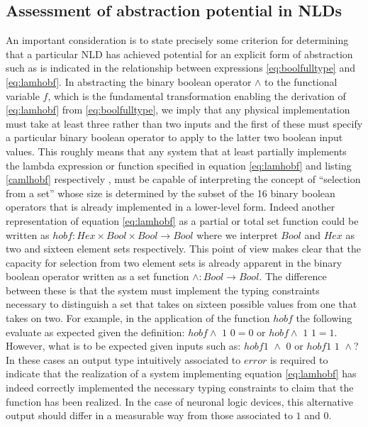 \subsection{Assessment of abstraction potential in NLDs}

An important consideration is to state precisely some criterion for
determining that a particular NLD has achieved potential for an explicit
form of abstraction such as is indicated in the relationship between
expressions \ref{eq:boolfulltype} and
\ref{eq:lamhobf}. In abstracting the binary boolean
operator $\wedge$ to the functional variable
$f$, which is the fundamental
transformation enabling the derivation of
\ref{eq:lamhobf} from
\ref{eq:boolfulltype}, we imply that any physical
implementation must take at least three rather than two inputs and the
first of these must specify a particular binary boolean operator to
apply to the latter two boolean input values. This roughly means that
any system that at least partially implements the lambda expression or
function specified in equation \ref{eq:lamhobf} and
listing \ref{camlhobf} respectively , must be capable of
interpreting the concept of ``selection from a set'' whose size is
determined by the subset of the 16 binary boolean operators that is
already implemented in a lower-level form. Indeed another representation
of equation \ref{eq:lamhobf} as a partial or total
set function could be written as $hobf : Hex \times Bool \times Bool \rightarrow Bool$
where we interpret $Bool$ and
$Hex$ as two and sixteen element sets
respectively. This point of view makes clear that the capacity for
selection from two element sets is already apparent in the binary
boolean operator written as a set function
$\wedge : Bool \rightarrow Bool$. The difference between these is
that the system must implement the typing constraints necessary to
distinguish a set that takes on sixteen possible values from one that
takes on two. For example, in the application of the function
$hobf$ the following evaluate as expected
given the definition: $hobf \wedge \,\, 1\,\, 0=0$ or
$hobf \wedge \,\, 1\,\, 1=1$. However, what is to be expected
given inputs such as: $hobf 1 \,\, \wedge\,\, 0$ or
$hobf 1 \,\, 1\,\, \wedge$? In these cases an output type
intuitively associated to $error$ is
required to indicate that the realization of a system implementing
equation \ref{eq:lamhobf} has indeed correctly
implemented the necessary typing constraints to claim that the function
has been realized. In the case of neuronal logic devices, this
alternative output should differ in a measurable way from those
associated to $1$ and $0$.

